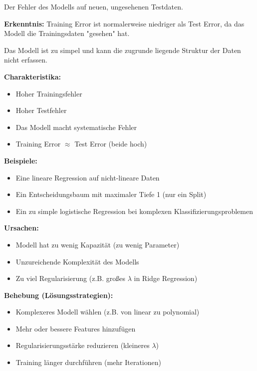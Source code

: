 Der Fehler des Modells auf neuen, ungesehenen Testdaten.

\textbf{Erkenntnis:} Training Error ist normalerweise niedriger als Test Error, da das Modell die Trainingsdaten "gesehen" hat.

Das Modell ist zu simpel und kann die zugrunde liegende Struktur der Daten nicht erfassen.

\textbf{Charakteristika:}
\begin{itemize}[leftmargin=1.5em]
    \item Hoher Trainingsfehler
    \item Hoher Testfehler
    \item Das Modell macht systematische Fehler
    \item Training Error $\approx$ Test Error (beide hoch)
\end{itemize}

\textbf{Beispiele:}
\begin{itemize}[leftmargin=1.5em]
    \item Eine lineare Regression auf nicht-lineare Daten
    \item Ein Entscheidungsbaum mit maximaler Tiefe 1 (nur ein Split)
    \item Ein zu simple logistische Regression bei komplexen Klassifizierungsproblemen
\end{itemize}

\textbf{Ursachen:}
\begin{itemize}[leftmargin=1.5em]
    \item Modell hat zu wenig Kapazität (zu wenig Parameter)
    \item Unzureichende Komplexität des Modells
    \item Zu viel Regularisierung (z.B. großes $\lambda$ in Ridge Regression)
\end{itemize}

\textbf{Behebung (Lösungsstrategien):}
\begin{itemize}[leftmargin=1.5em]
    \item Komplexeres Modell wählen (z.B. von linear zu polynomial)
    \item Mehr oder bessere Features hinzufügen
    \item Regularisierungsstärke reduzieren (kleineres $\lambda$)
    \item Training länger durchführen (mehr Iterationen)
\end{itemize}

